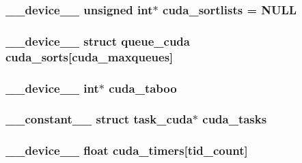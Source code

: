 \hypertarget{runner__cuda_8cu_a8f61841655b1d6ac66a33b9c58a9451b}{
\subsubsection[{cuda\-\_\-sortlists}]{\setlength{\rightskip}{0pt plus 5cm}\-\_\-\-\_\-device\-\_\-\-\_\- unsigned int$\ast$ cuda\-\_\-sortlists = N\-U\-L\-L}}\label{runner__cuda_8cu_a8f61841655b1d6ac66a33b9c58a9451b}
\hypertarget{runner__cuda_8cu_a27243fc18ae76301693c0cf9e1de4d16}{
\subsubsection[{cuda\-\_\-sorts}]{\setlength{\rightskip}{0pt plus 5cm}\-\_\-\-\_\-device\-\_\-\-\_\- struct {\bf queue\-\_\-cuda} cuda\-\_\-sorts\mbox{[}{\bf cuda\-\_\-maxqueues}\mbox{]}}}\label{runner__cuda_8cu_a27243fc18ae76301693c0cf9e1de4d16}
\hypertarget{runner__cuda_8cu_aa0b6600f0328ae28392b5ac1b928433a}{
\subsubsection[{cuda\-\_\-taboo}]{\setlength{\rightskip}{0pt plus 5cm}\-\_\-\-\_\-device\-\_\-\-\_\- int$\ast$ cuda\-\_\-taboo}}\label{runner__cuda_8cu_aa0b6600f0328ae28392b5ac1b928433a}
\hypertarget{runner__cuda_8cu_aaa757a57fa1ece5a1cadbce0c44836b4}{
\subsubsection[{cuda\-\_\-tasks}]{\setlength{\rightskip}{0pt plus 5cm}\-\_\-\-\_\-constant\-\_\-\-\_\- struct {\bf task\-\_\-cuda}$\ast$ cuda\-\_\-tasks}}\label{runner__cuda_8cu_aaa757a57fa1ece5a1cadbce0c44836b4}
\hypertarget{runner__cuda_8cu_af29e45416fba4fd84a57a2ba85bc7fb1}{
\subsubsection[{cuda\-\_\-timers}]{\setlength{\rightskip}{0pt plus 5cm}\-\_\-\-\_\-device\-\_\-\-\_\- float cuda\-\_\-timers\mbox{[}{\bf tid\-\_\-count}\mbox{]}}}\label{runner__cuda_8cu_af29e45416fba4fd84a57a2ba85bc7fb1}
